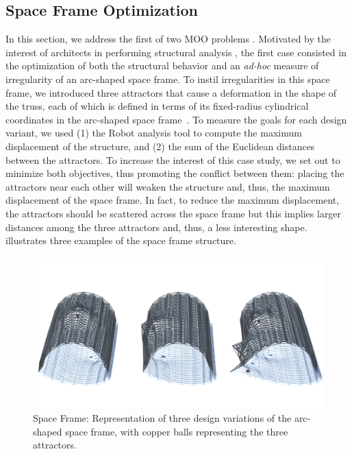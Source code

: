 \subsection{Space Frame Optimization}

In this section, we address the first of two \ac{MOO} problems \cite{Belem2019MOO,IP2019MOO}. Motivated by the interest of architects in performing structural analysis \cite{Cichocka2017SURVEY}, the first case consisted in the optimization of both the structural behavior and an \textit{ad-hoc} measure of irregularity of an arc-shaped space frame. To instil irregularities in this space frame, we introduced three attractors that cause a deformation in the shape of the truss, each of which is defined in terms of its fixed-radius cylindrical coordinates in the arc-shaped space frame~\cite{Belem2019MOO}. To measure the goals for each design variant, we used (1) the Robot analysis tool to compute the maximum displacement of the structure, and (2) the sum of the Euclidean distances between the attractors. To increase the interest of this case study, we set out to minimize both objectives, thus promoting the conflict between them: placing the attractors near each other will weaken the structure and, thus, the maximum displacement of the space frame. In fact, to reduce the maximum displacement, the attractors should be scattered across the space frame but this implies larger distances among the three attractors and, thus, a less interesting shape.  illustrates three examples of the space frame structure. 

\begin{figure}[htbp]
	\centering
	\includegraphics[width=1\textwidth]{Images/Evaluation/truss-kat.png}
	\caption[Space Frame: Representation of three space frame design variants]{Space Frame: Representation of three design variations of the arc-shaped space frame, with copper balls representing the three attractors.}
	\label{fig:spaceframe}
\end{figure}

